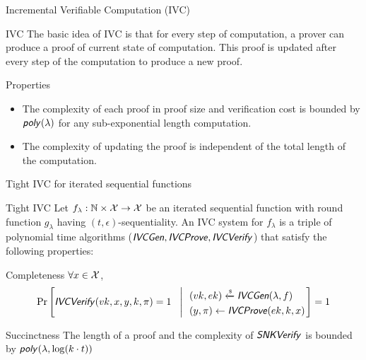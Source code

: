\documentclass[UTF8]{beamer}
\begin{document}
	\begin{frame}{Incremental Verifiable Computation (IVC)}
		\begin{block}{IVC}
			The basic idea of IVC is that for every step of computation, a prover can produce a proof of current state of computation. This proof is updated after every step of the computation to produce a new proof.
		\end{block}
		\begin{block}{Properties}
			\begin{itemize}
				\item The complexity of each proof in proof size and verification cost is bounded by $\textsf{\textit{poly}}(\lambda)$ for any sub-exponential length computation.
				\item The complexity of updating the proof is independent of the total length of the computation.
			\end{itemize}
		\end{block}
	\end{frame}
	\begin{frame}{Tight IVC for iterated sequential functions}
		\begin{block}{Tight IVC}
			Let $f_\lambda:\mathbb{N}\times\mathcal{X}\to\mathcal{X}$ be an iterated sequential function with round function $g_\lambda$ having $(t,\epsilon)$-sequentiality. An IVC system for $f_\lambda$ is a triple of polynomial time algorithms ($\textsf{\textit{IVCGen}},\textsf{\textit{IVCProve}},\textsf{\textit{IVCVerify}}$) that satisfy the following properties:
		\end{block}
		\begin{block}{Completeness}
			$\forall x\in\mathcal{X}$,
			\begin{equation*}
				\Pr\left[
				\textsf{\textit{IVCVerify}}(vk,x,y,k,\pi)=1
				~~\left|~~
				\begin{aligned}
					&(vk,ek)\xleftarrow{\text{\tiny$\mathsf{\$}$}}\textsf{\textit{IVCGen}}(\lambda,f)\\
					&(y,\pi)\gets\textsf{\textit{IVCProve}}(ek,k,x)
				\end{aligned}
				\right.\right]=1
			\end{equation*}
		\end{block}
		\begin{block}{Succinctness}
			The length of a proof and the complexity of $\textsf{\textit{SNKVerify}}$ is bounded by $\textsf{\textit{poly}}(\lambda,\log(k\cdot t))$
		\end{block}
	\end{frame}
\end{document}

